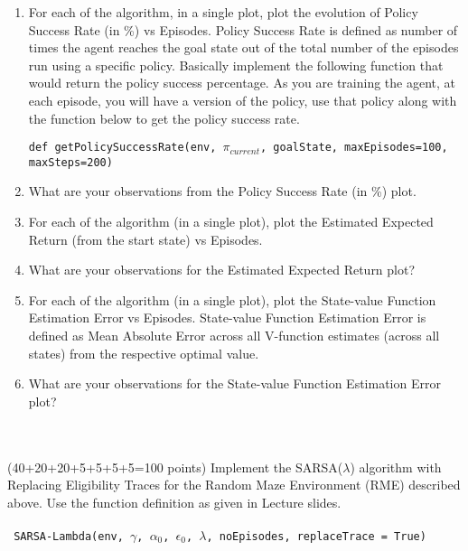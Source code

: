\documentclass[a4 paper]{article}
\numberwithin{equation}{section}
\newcommand{\problem}[2]{~\\\fbox{\textbf{Problem #1}}\\(#2 points)\newline\newline}
\newcommand{\0}{\mathbf{0}}
\begin{document}
\begin{enumerate}[label=(\alph*)]
\item For each of the algorithm, in a single plot, plot the evolution of Policy Success Rate (in \%) vs Episodes. Policy Success Rate is defined as number of times the agent reaches the goal state out of the total number of the episodes run using a specific policy. Basically implement the following function that would return the policy success percentage. As you are training the agent, at each episode, you will have a version of the policy, use that policy along with the function below to get the policy success rate. 

\texttt{def getPolicySuccessRate(env, $\pi_{current}$, goalState, maxEpisodes=100, maxSteps=200)}

\item What are your observations from the Policy Success Rate (in \%) plot. 

\item For each of the algorithm (in a single plot), plot the Estimated Expected Return (from the start state) vs Episodes.

\item What are your observations for the Estimated Expected Return plot?

\item For each of the algorithm (in a single plot), plot the State-value Function Estimation Error vs Episodes. State-value Function Estimation Error is defined as Mean Absolute Error across all V-function estimates (across all states) from the respective optimal value.  

\item What are your observations for the State-value Function Estimation Error plot?

\end{enumerate}

\problem{6: SARSA($\lambda$) Replacing}{40+20+20+5+5+5+5=100}
Implement the SARSA($\lambda$) algorithm with Replacing Eligibility Traces for the Random Maze Environment (RME) described above. Use the function definition as given in Lecture slides. \\
\\
\texttt{
SARSA-Lambda(env, $\gamma$, $\alpha_{0}$, $\epsilon_{0}$, $\lambda$, noEpisodes, replaceTrace = True)
}
\end{document}

